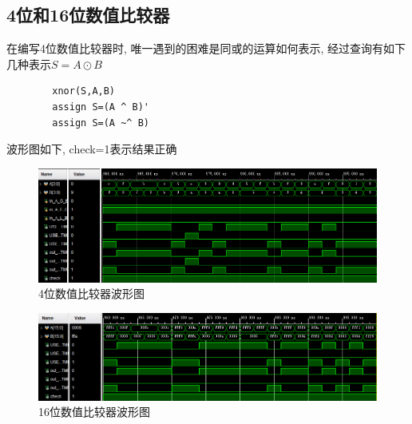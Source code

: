 \documentclass[fontset=windows,12pt]{article}
\begin{document}
    \subsection{4位和16位数值比较器}
        在编写4位数值比较器时, 唯一遇到的困难是同或的运算如何表示, 经过查询有如下几种表示$S=A\odot B$
        {\setmainfont{Courier New Bold} 
        \begin{lstlisting}
        xnor(S,A,B)
        assign S=(A ^ B)'
        assign S=(A ~^ B)
        \end{lstlisting}}
        波形图如下, check=1表示结果正确
        \begin{figure}[ht]
            \centering
            \includegraphics[width=1\textwidth]{4位比较器波形图.jpg}
            \caption{4位数值比较器波形图}
        \end{figure}\par
        \begin{figure}[ht]
            \centering
            \includegraphics[width=1\textwidth]{16位数值比较器波形图.jpg}
            \caption{16位数值比较器波形图}
        \end{figure}\par
\end{document}

